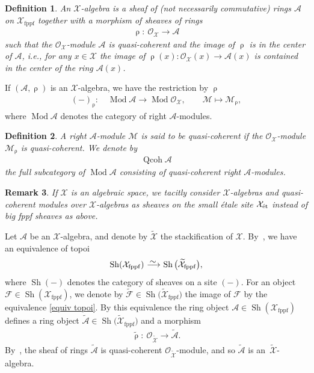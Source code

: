 \documentclass[11pt]{article}
\numberwithin{equation}{section}
\newtheorem{dfn}{Definition}[section]
\newtheorem{rem}[dfn]{Remark}
\numberwithin{equation}{section}
\newcommand{\Qcoh}{\operatorname{Qcoh}}
\newcommand{\Mod}{\operatorname{Mod}}
\newcommand{\fppf}{\operatorname{fppf}}
\newcommand{\Sh}{\operatorname{Sh}}
\newcommand{\et}{\text{\rm \'et}}
\newcommand{\cA}{\mathcal{A}}
\newcommand{\cF}{\mathcal{F}}
\newcommand{\cM}{\mathcal{M}}
\newcommand{\cO}{\mathcal{O}}
\newcommand{\cX}{\mathcal{X}}
\newcommand{\simto}{\,\,\,\,\raisebox{4pt}{$\sim$}{\kern -1.1em \longrightarrow}\,}
\begin{document}
 \begin{dfn} An {\it ${\cX}$-algebra} is a sheaf of (not necessarily commutative) rings $\cA$ on $\cX_{\fppf}$ together with a morphism of sheaves of rings
 \begin{gather*}
 \uprho\colon\ \cO_{\cX}\to \cA
 \end{gather*}
 such that the $\cO_{\cX}$-module $\cA$ is quasi-coherent and the image of $\uprho$ is in the center of $\cA$, i.e., for any $x\in \cX$ the image of $\uprho(x)\colon \cO_{\cX}(x)\to \cA(x)$ is contained in the center of the ring $\cA(x)$.
\end{dfn}

 If $(\cA,\uprho)$ is an $\cX$-algebra, we have the restriction by $\uprho$
 \begin{gather*}
 (-)_{\uprho}\colon\quad \Mod\cA\to \Mod\cO_{\cX}, \qquad \cM\mapsto \cM_{\uprho},
 \end{gather*}
 where $ \Mod\cA$ denotes the category of right $\cA$-modules.
 \begin{dfn} A right $\cA$-module $\cM$ is said to be {\it quasi-coherent} if the $\cO_{\cX}$-module $\cM_{\uprho}$ is quasi-coherent. We denote by
 \begin{gather*}
 \Qcoh\cA
 \end{gather*}
 the full subcategory of $\Mod\cA$ consisting of quasi-coherent right $\cA$-modules.
 \end{dfn}

 \begin{rem}
 If $\cX$ is an algebraic space, we tacitly consider $\cX$-algebras and quasi-coherent modules over $\cX$-algebras as sheaves on the small \'etale site $\cX_{\et}$ instead of big fppf sheaves as above.
 \end{rem}



Let $\cA$ be an $\cX$-algebra, and denote by $\widetilde{\cX}$ the stackification of $\cX$. By~\cite[Lemma~12.1; 06WQ]{stacks}, we have an equivalence of topoi
\begin{equation}\label{equiv topoi}
\Sh(\cX_{\fppf})\simto \Sh\big(\widetilde{\cX}_{\fppf}\big),
\end{equation}
where $\Sh(-)$ denotes the category of sheaves on a site $(-)$. For an object $\cF\in \Sh(\cX_{\fppf})$, we denote by $\widetilde{\cF}\in\Sh\big(\widetilde{\cX}_{\fppf}\big)$ the image of $\cF$ by the equivalence \eqref{equiv topoi}.
By this equivalence the ring object $\cA\in\Sh(\cX_{\fppf})$ defines a ring object $\widetilde{\cA}\in\Sh\big(\widetilde{\cX}_{\fppf}\big)$ and a morphism
\begin{gather*}
\widetilde{\uprho}\colon\ \cO_{\widetilde{\cX}}\to \widetilde{\cA}.
\end{gather*}
By~\cite[Lemma~12.2; 06WR]{stacks}, the sheaf of rings $\widetilde{\cA}$ is quasi-coherent $\cO_{\widetilde{\cX}}$-module, and so $\widetilde{\cA}$ is an~$\widetilde{\cX}$-algebra.
\end{document}
